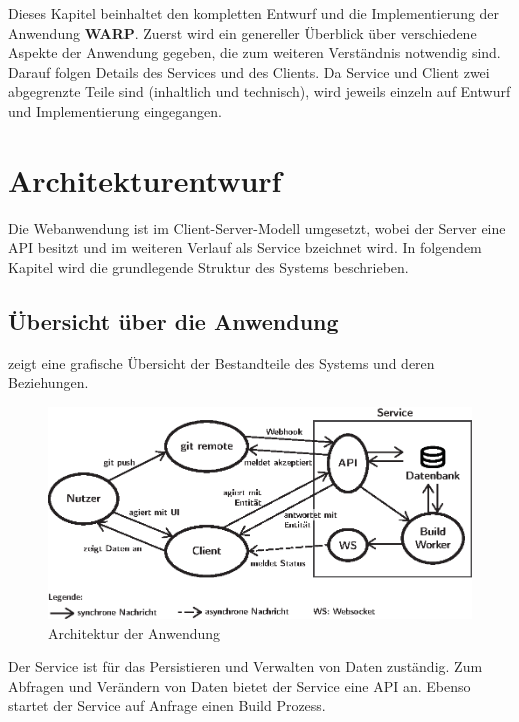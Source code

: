 Dieses Kapitel beinhaltet den kompletten Entwurf und die Implementierung der Anwendung \textbf{WARP}. Zuerst wird ein genereller Überblick über verschiedene Aspekte der Anwendung gegeben, die zum weiteren Verständnis notwendig sind. Darauf folgen Details des Services und des Clients. Da Service und Client zwei abgegrenzte Teile sind (inhaltlich und technisch), wird jeweils einzeln auf Entwurf und Implementierung eingegangen.

\section{Architekturentwurf}
\label{sec:architektur}

Die Webanwendung ist im Client-Server-Modell umgesetzt, wobei der Server eine API besitzt und im weiteren Verlauf als Service bzeichnet wird. In folgendem Kapitel wird die grundlegende Struktur des Systems beschrieben.

\subsection{Übersicht über die Anwendung}
\label{subsec:uebersicht-anwendung}

 zeigt eine grafische Übersicht der Bestandteile des Systems und deren Beziehungen.

\begin{figure}[h]
  \caption{Architektur der Anwendung}
  \label{fig:architektur}
  \centering
    \includegraphics[width=\textwidth]{assets/systemarchitektur}
\end{figure}


Der Service ist für das Persistieren und Verwalten von Daten zuständig. Zum Abfragen und Verändern von Daten bietet der Service eine \ac{API} an. Ebenso startet der Service auf Anfrage einen Build Prozess.

